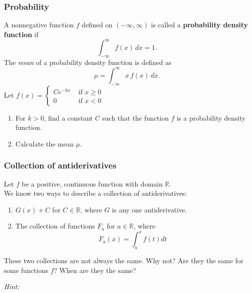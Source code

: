 \documentclass[14pt]{beamer}
\begin{document}
\begin{frame}[t]
	\fontsize{13}{13}\selectfont
	\frametitle{Probability}

	\fontsize{13}{13}\selectfont
	\vspace{-2mm}

	A nonnegative function $f$ defined on $(-\infty,\infty)$ is called a {\bfseries probability density function }
	if
	\vspace{-2mm}
	\[
		\int_{-\infty}^{\infty}f(x)\, dx=1.
	\]
	The \emph{mean} of a probability density function is defined as
	\vspace{-2mm}
	\[
		\mu=\int_{-\infty}^{\infty}x \, f(x)\, dx.
	\]
	Let $\displaystyle f(x) =
	\begin{cases}
		Ce^{-kx} & \text{ if }x\geq 0 \\
		0        & \text{ if }x <0
	\end{cases}$
	\begin{enumerate}
		\item For $k>0$, find a constant $C$ such that the function $f$ is a
			probability density function.

		\item Calculate the mean $\mu$.
	\end{enumerate}
\end{frame}

\begin{frame}[t]
	\fontsize{13}{13}\selectfont
	\frametitle{Collection of antiderivatives}

	Let $\displaystyle f$ be a positive, continuous function with domain
	$\mathbb{R}$. \\ We know two ways to describe a collection of antiderivatives:
	\begin{enumerate}
		\item $\displaystyle G(x) + C$ for $C \in \mathbb{R}$, where $G$ is any one
			antiderivative.

		\item The collection of functions $\displaystyle F_{a}$ for $\displaystyle a
			\in \mathbb{R}$, where
			\[
				F_{a}(x) = \int_{a}^{x}f(t) dt
			\]
	\end{enumerate}

	These two collections are not always the same. Why not? Are they the same for some
	functions $f$? When are they the same?

	\vspace{2.5cm}
	\hfill \emph{Hint:} \quad \href{https://tinyurl.com/137antiderivatives}{}
\end{frame}
\end{document}
